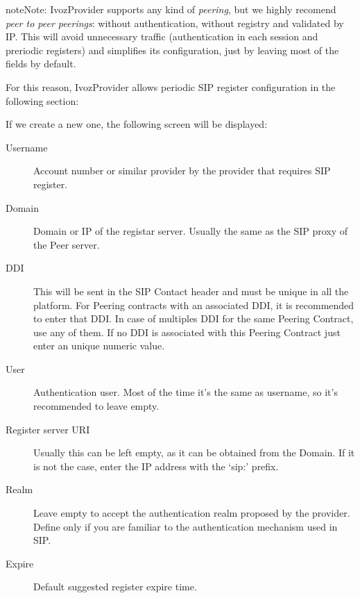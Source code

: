 \documentclass[letterpaper,10pt,english]{sphinxmanual}
\begin{document}
\begin{notice}{note}{Note:}
IvozProvider supports any kind of \emph{peering}, but we highly recomend
\emph{peer to peer peerings}: without authentication, without registry and
validated by IP. This will avoid unnecessary traffic (authentication in each
session and preriodic registers) and simplifies its configuration, just by
leaving most of the fields by default.
\end{notice}

For this reason, IvozProvider allows periodic SIP register configuration in the
following section:

\noindent{}

If we create a new one, the following screen will be displayed:

\noindent{}
\begin{description}
\item[{Username}] \leavevmode{}\label{brand/peering/sip_register:term-username}
Account number or similar provider by the provider that requires SIP
register.

\item[{Domain}] \leavevmode{}\label{brand/peering/sip_register:term-domain}
Domain or IP of the registar server. Usually the same as the SIP proxy
of the Peer server.

\item[{DDI}] \leavevmode{}\label{brand/peering/sip_register:term-ddi}
This will be sent in the SIP Contact header and must be unique in all
the platform. For Peering contracts with an associated DDI, it is
recommended to enter that DDI. In case of multiples DDI for the same
Peering Contract, use any of them. If no DDI is associated with this
Peering Contract just enter an unique numeric value.

\item[{User}] \leavevmode{}\label{brand/peering/sip_register:term-user}
Authentication user. Most of the time it's the same as username, so
it's recommended to leave empty.

\item[{Register server URI}] \leavevmode{}\label{brand/peering/sip_register:term-register-server-uri}
Usually this can be left empty, as it can be obtained from the
Domain. If it is not the case, enter the IP address with the `sip:'
prefix.

\item[{Realm}] \leavevmode{}\label{brand/peering/sip_register:term-realm}
Leave empty to accept the authentication realm proposed by the provider.
Define only if you are familiar to the authentication mechanism used
in SIP.

\item[{Expire}] \leavevmode{}\label{brand/peering/sip_register:term-expire}
Default suggested register expire time.

\end{description}
\end{document}
